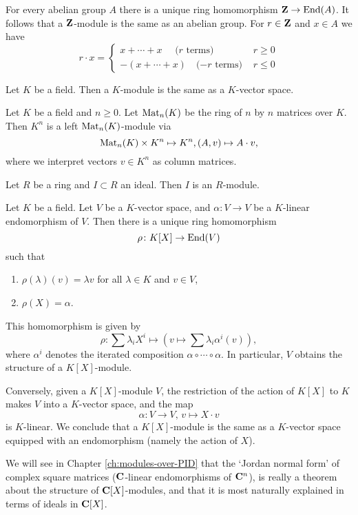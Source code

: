 \begin{example} For every abelian group $A$ there is a unique ring homomorphism 
${\mathbf{Z}} \to \operatorname{\mathrm{End}}(A)$. It follows that a ${\mathbf{Z}}$-module is the same as an abelian group.
For $r\in {\mathbf{Z}}$ and $x\in A$ we have
\[
	r \cdot x = \begin{cases} x + \cdots + x\quad \text{ ($r$ terms) } & r \geq 0 \\
	-(x+ \cdots + x ) \quad\text{($-r$ terms) } & r \leq 0 \end{cases}
\]
\end{example}

\begin{example} Let $K$ be a field. Then a $K$-module is the same as a $K$-vector space.
\end{example}

\begin{example} Let $K$ be a field and $n\geq 0$. Let $\operatorname{Mat}_n(K)$ be the ring of $n$ by $n$ matrices over $K$. Then $K^n$ is a left $\operatorname{Mat}_n(K)$-module via
\[
	\operatorname{Mat}_n(K) \times K^n \mapsto K^n, (A, v) \mapsto A\cdot v,
\]
where we interpret vectors $v\in K^n$ as column matrices.
\end{example}


\begin{example} Let $R$ be a ring and $I\subset R$ an ideal. Then $I$ is an $R$-module.
\end{example}


\begin{example}\label{exa:vect-with-endo}
Let $K$ be a field. Let $V$ be a $K$-vector space, and $\alpha\colon V\to V$ be a $K$-linear endomorphism of $V$. Then there is a unique ring homomorphism
\[
	\rho\colon K[X] \to \operatorname{\mathrm{End}}(V)
\]
such that 
\begin{enumerate}
\item $\rho(\lambda)(v) = \lambda v$ for all $\lambda \in K$ and $v\in V$\!, 
\item $\rho(X)=\alpha$.	
\end{enumerate}
This homomorphism is given by
\begin{equation}\label{eq:vect-with-endo}	
	\rho\colon \sum \lambda_i X^i \mapsto \left( v \mapsto \sum \lambda_i \alpha^i(v) \right),
\end{equation}
where $\alpha^i$ denotes the iterated composition $\alpha \circ \cdots \circ \alpha$. In particular, $V$ obtains the structure of a $K[X]$-module.

Conversely, given a $K[X]$-module $V$, the restriction of the action of $K[X]$ to $K$ makes $V$ into a $K$-vector space, and the map
\[
	\alpha\colon V \to V,\, v \mapsto X\cdot v
\]
is $K$-linear. We conclude that a $K[X]$-module is the same as a $K$-vector space equipped with an endomorphism (namely the action of $X$).

We will see in Chapter \ref{ch:modules-over-PID} that the `Jordan normal form' of complex square matrices (${\mathbf{C}}$-linear endomorphisms of ${\mathbf{C}}^n$), is really a theorem about the structure of ${\mathbf{C}}[X]$-modules, and that it is most naturally explained in  terms of ideals in ${\mathbf{C}}[X]$.
\end{example}


